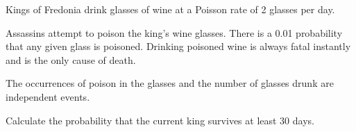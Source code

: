  Kings of Fredonia drink glasses of wine at a Poisson rate of 2 glasses per day.

\medskip
Assassins attempt to poison the king's wine glasses. There is a 0.01 probability that any
given glass is poisoned. Drinking poisoned wine is always fatal instantly and is the only
cause of death.

\medskip
The occurrences of poison in the glasses and the number of glasses drunk are independent
events.
\medskip

Calculate the probability that the current king survives at least 30 days.




